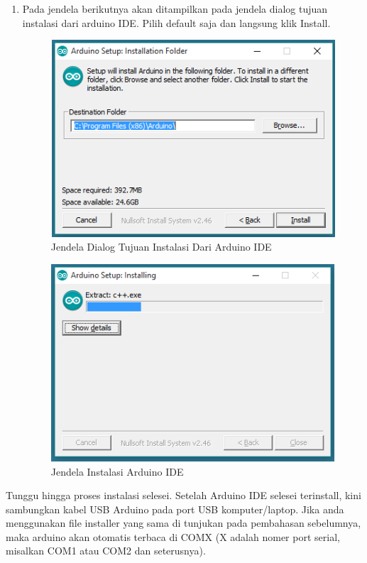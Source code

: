\begin{enumerate}
\item Pada jendela berikutnya akan ditampilkan pada jendela dialog tujuan instalasi dari arduino IDE. Pilih default saja dan langsung klik Install.
\begin{figure}[H]
\centering
\includegraphics[width=1\textwidth]{figures/ide2.png}
\caption{Jendela Dialog Tujuan Instalasi Dari Arduino IDE }
\label{print}
\end{figure}

\begin{figure}[H]
\centering
\includegraphics[width=1\textwidth]{figures/ide3.png}
\caption{Jendela Instalasi Arduino IDE }
\label{print}
\end{figure}
\end{enumerate}
\par Tunggu hingga proses instalasi selesei. Setelah Arduino IDE selesei terinstall, kini sambungkan kabel USB Arduino  pada port USB komputer/laptop. Jika anda menggunakan file installer yang sama di tunjukan pada pembahasan sebelumnya, maka arduino akan otomatis terbaca di COMX (X adalah nomer port serial, misalkan COM1 atau COM2 dan seterusnya).

